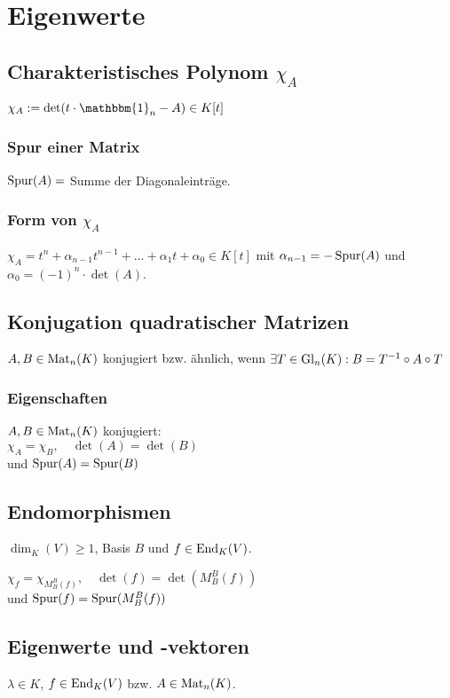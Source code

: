 \section*{Eigenwerte}

\subsection*{Charakteristisches Polynom $\chi_A$}
$\chi_A := \det(t\cdot\mathbbm{1}_n - A)\in K[t]$

\subsubsection*{Spur einer Matrix}
$\operatorname{Spur}(A)=$ Summe der Diagonaleinträge.

\subsubsection*{Form von $\chi_A$}
$\chi_A=t^n + \alpha_{n-1}t^{n-1}+\dots+\alpha_1 t + \alpha_0 \in K[t]$
mit $\alpha_{n-1}=-\operatorname{Spur}(A)$ und $\alpha_0=(-1)^n\cdot\det(A)$.

\subsection*{Konjugation quadratischer Matrizen}
$A,B\in\operatorname{Mat}_n(K)$ konjugiert bzw. ähnlich, wenn
$\exists T\in\operatorname{Gl}_n(K): B=T^{-1}\circ A \circ T$

\subsubsection*{Eigenschaften}
$A,B\in\operatorname{Mat}_n(K)$ konjugiert: \\
$\chi_A=\chi_B,\quad \det(A)=\det(B)$ \\ und $\operatorname{Spur}(A)=\operatorname{Spur}(B)$

\subsection*{Endomorphismen}
$\dim_K(V) \ge 1$, Basis $B$ und $f\in\operatorname{End}_K(V)$.

$\chi_f = \chi_{M_B^B(f)},\quad \det(f)=\det(M_B^B(f))$\\
und $\operatorname{Spur}(f)=\operatorname{Spur}(M_B^B(f))$

\subsection*{Eigenwerte und -vektoren}
$\lambda \in K$, $f\in\operatorname{End}_K(V)$ bzw. $A\in\operatorname{Mat}_n(K)$.


